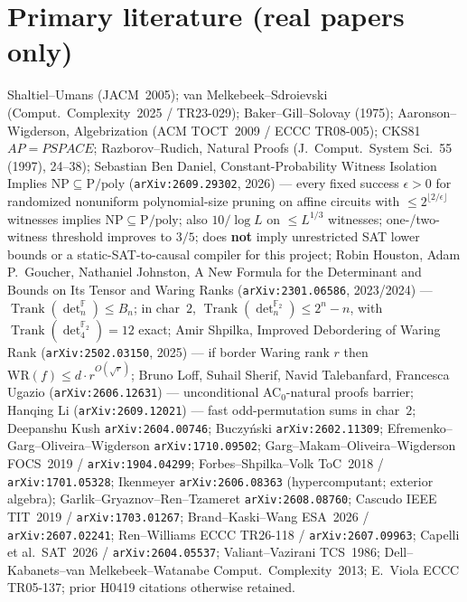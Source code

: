 \documentclass[11pt]{article}
\begin{document}
\section*{Primary literature (real papers only)}
Shaltiel--Umans (JACM~2005); van Melkebeek--Sdroievski (Comput.\ Complexity~2025 /
TR23-029); Baker--Gill--Solovay (1975); Aaronson--Wigderson, Algebrization
(ACM TOCT~2009 / ECCC TR08-005); CKS81 $AP=PSPACE$; Razborov--Rudich, Natural
Proofs (J.\ Comput.\ System Sci.\ 55 (1997), 24--38);
Sebastian Ben Daniel, Constant-Probability Witness Isolation Implies
$\mathrm{NP}\subseteq\mathrm{P/poly}$
(\texttt{arXiv:2609.29302}, 2026) --- every fixed success $\epsilon>0$ for
randomized nonuniform polynomial-size pruning on affine circuits with
$\le 2^{\lfloor 2/\epsilon\rfloor}$ witnesses implies
$\mathrm{NP}\subseteq\mathrm{P/poly}$; also $10/\log L$ on
$\le L^{1/3}$ witnesses; one-/two-witness threshold improves to $3/5$;
does \textbf{not} imply unrestricted SAT lower bounds or a
static-SAT-to-causal compiler for this project;
Robin Houston, Adam P.\ Goucher, Nathaniel Johnston, A New Formula for the
Determinant and Bounds on Its Tensor and Waring Ranks
(\texttt{arXiv:2301.06586}, 2023/2024) --- $\operatorname{Trank}(\det_n^{\mathbb F})\le B_n$;
in char~$2$, $\operatorname{Trank}(\det_n^{\mathbb F_2})\le 2^n-n$, with
$\operatorname{Trank}(\det_4^{\mathbb F_2})=12$ exact;
Amir Shpilka, Improved Debordering of Waring Rank
(\texttt{arXiv:2502.03150}, 2025) --- if border Waring rank $r$ then
$\mathrm{WR}(f)\le d\cdot r^{O(\sqrt r)}$;
Bruno Loff, Suhail Sherif, Navid Talebanfard, Francesca Ugazio
(\texttt{arXiv:2606.12631}) --- unconditional AC$_0$-natural proofs barrier;
Hanqing Li (\texttt{arXiv:2609.12021}) --- fast odd-permutation sums in char~$2$;
Deepanshu Kush \texttt{arXiv:2604.00746}; Buczy\'nski \texttt{arXiv:2602.11309};
Efremenko--Garg--Oliveira--Wigderson \texttt{arXiv:1710.09502};
Garg--Makam--Oliveira--Wigderson FOCS~2019 / \texttt{arXiv:1904.04299};
Forbes--Shpilka--Volk ToC~2018 / \texttt{arXiv:1701.05328};
Ikenmeyer \texttt{arXiv:2606.08363} (hypercomputant; exterior algebra);
Garlik--Gryaznov--Ren--Tzameret \texttt{arXiv:2608.08760};
Cascudo IEEE TIT~2019 / \texttt{arXiv:1703.01267};
Brand--Kaski--Wang ESA~2026 / \texttt{arXiv:2607.02241};
Ren--Williams ECCC TR26-118 / \texttt{arXiv:2607.09963};
Capelli et al.\ SAT~2026 / \texttt{arXiv:2604.05537};
Valiant--Vazirani TCS~1986; Dell--Kabanets--van Melkebeek--Watanabe Comput.\ Complexity~2013;
E.\ Viola ECCC TR05-137; prior H0419 citations otherwise retained.
\end{document}

